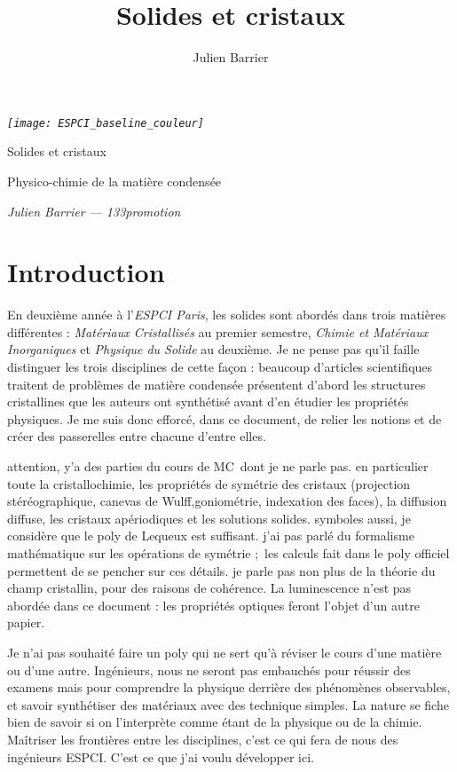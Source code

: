 \documentclass[a4paper,justified,twoside,nobib]{tufte-book}
\title{Solides et cristaux}
\author[Julien Barrier]{Julien Barrier}
\newcommand{\thetitle}{Solides et cristaux}
\newcommand{\theauthor}{Julien Barrier --- 133\ieme promotion}
\newcommand{\thesubtitle}{Physico-chimie de la matière condensée}
\newcommand{\pc}{l'\textit{ESPCI Paris}\xspace}
\renewcommand{\=}[1]{\stackrel{#1}{=}} %
\begin{document}
\frontmatter

\thispagestyle{empty}
\begin{fullwidth}
\setlength{\parindent}{0pt}

\begin{center}\fontsize{24}{24}\selectfont\textit{\texttt{[image: ESPCI\_baseline\_couleur]}}
\end{center}

\vspace{3in}\fontsize{36}{54}\selectfont\thetitle

\vspace{0.125in}\fontsize{18}{18}\selectfont\thesubtitle

\vfill\fontsize{14}{14}\selectfont\textit{\theauthor}
\end{fullwidth}

\newpage


\cleardoublepage
\chapter*{Introduction}
En deuxième année à \pc, les solides sont abordés dans trois matières 
différentes : \emph{Matériaux Cristallisés} au premier semestre, 
\emph{Chimie et Matériaux Inorganiques} et \emph{Physique du Solide} au 
deuxième. Je ne pense pas qu'il faille distinguer les trois disciplines de cette
façon : beaucoup d'articles scientifiques traitent de problèmes de matière 
condensée présentent d'abord les structures cristallines que les auteurs ont 
synthétisé avant d'en étudier les propriétés physiques. Je me suis donc efforcé,
dans ce document, de relier les notions et de créer des passerelles entre 
chacune d'entre elles.

attention, y'a des parties du cours de MC dont je ne parle pas. en particulier
toute la cristallochimie, les propriétés de symétrie des cristaux (projection
stéréographique, canevas de Wulff,goniométrie, indexation des faces), la 
diffusion diffuse, les cristaux apériodiques et les solutions solides. symboles
aussi, je considère que le poly de Lequeux est suffisant. j'ai pas parlé du
formalisme mathématique sur les opérations de symétrie ; les calculs fait dans 
le poly officiel permettent de se pencher sur ces détails. je parle pas non plus
de la théorie du champ cristallin, pour des raisons de cohérence.
La luminescence n'est pas abordée dans ce document : les propriétés optiques
feront l'objet d'un autre papier.

Je n'ai pas souhaité faire un poly qui ne sert qu'à réviser le cours d'une 
matière ou d'une autre. Ingénieurs, nous ne seront pas embauchés pour réussir 
des examens mais pour comprendre la physique derrière des phénomènes 
observables, et savoir synthétiser des matériaux avec des technique simples. La 
nature se fiche bien de savoir si on l'interprète comme étant de la physique ou 
de la chimie. Maîtriser les frontières entre les disciplines, c'est ce qui fera 
de nous des ingénieurs ESPCI. C'est ce que j'ai voulu développer ici.
\end{document}
